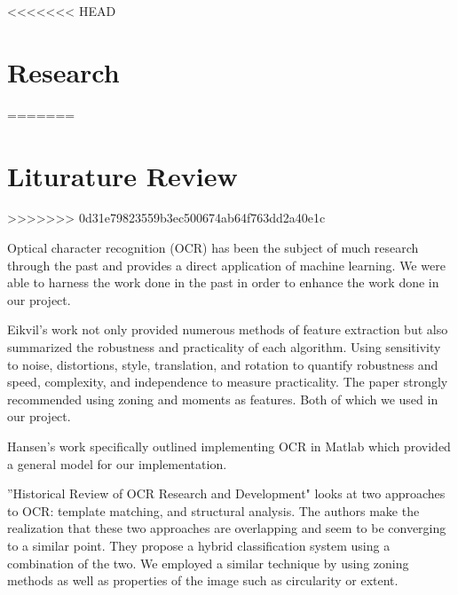 <<<<<<< HEAD
\section{Research}
=======
\section{Liturature Review}
>>>>>>> 0d31e79823559b3ec500674ab64f763dd2a40e1c

Optical character recognition (OCR) has been the subject of much research through the past and provides a direct application of machine learning. We were able to harness the work done in the past in order to enhance the work done in our project. 

Eikvil's work \cite{one} not only provided numerous methods of feature extraction but also summarized the robustness and practicality of each algorithm. Using sensitivity to noise, distortions, style, translation, and rotation to quantify robustness and speed, complexity, and independence to measure practicality. The paper strongly recommended using zoning and moments as features. Both of which we used in our project.

Hansen's work \cite{two} specifically outlined implementing OCR in Matlab which provided a general model for our implementation.

''Historical Review of OCR Research and Development" \cite{three} looks at two approaches to OCR: template matching, and structural analysis. The authors make the realization that these two approaches are overlapping and seem to be converging to a similar point. They propose a hybrid classification system using a combination of the two. We employed a similar technique by using zoning methods as well as properties of the image such as circularity or extent.